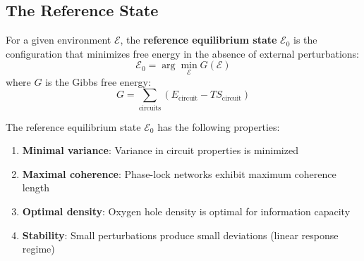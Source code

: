 \subsection{The Reference State}

\begin{definition}
\label{def:reference_state}
For a given environment $\mathcal{E}$, the \textbf{reference equilibrium state} $\mathcal{E}_0$ is the configuration that minimizes free energy in the absence of external perturbations:
\begin{equation}
\mathcal{E}_0 = \arg\min_{\mathcal{E}} G(\mathcal{E})
\end{equation}
where $G$ is the Gibbs free energy:
\begin{equation}
G = \sum_{\text{circuits}} (E_{\text{circuit}} - T S_{\text{circuit}})
\end{equation}
\end{definition}

\begin{theorem}
\label{thm:reference_properties}
The reference equilibrium state $\mathcal{E}_0$ has the following properties:
\begin{enumerate}
\item \textbf{Minimal variance}: Variance in circuit properties is minimized
\item \textbf{Maximal coherence}: Phase-lock networks exhibit maximum coherence length
\item \textbf{Optimal density}: Oxygen hole density is optimal for information capacity
\item \textbf{Stability}: Small perturbations produce small deviations (linear response regime)
\end{enumerate}
\end{theorem}

